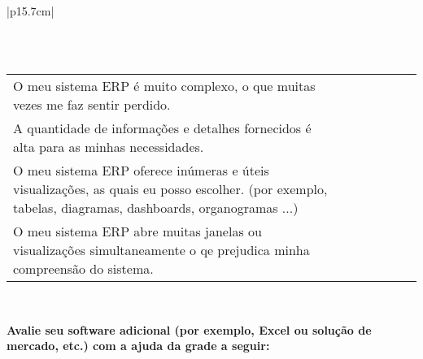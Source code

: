 \begin{longtable}{|p{15.7cm}|}
\begin{tabularx}{15.7 cm}{|X|X|X|X|X|X|X|}
		\hline
	\end{tabularx}\\
	\tiny \begin{tabularx}{15.7 cm}{|X|X|X|X|X|X|X|}
		\hline
		& {\rotatebox[origin=c]{90}{\parbox[c]{2.5cm}{\centering \textcolor{white}{.}\newline \medskip Concordo Completamente}}} 
		& {\rotatebox[origin=c]{90}{\parbox[c]{2.5cm}{\centering \textcolor{white}{.}\newline \medskip Concordo Parcialmente}}} 
		& {\rotatebox[origin=c]{90}{\parbox[c]{2.5cm}{\centering \textcolor{white}{.}\newline \medskip Não Concordo \newline Nem Discordo}}}	 
		& {\rotatebox[origin=c]{90}{\parbox[c]{2.5cm}{\centering \textcolor{white}{.}\newline \medskip Discordo  Parcialmente }}} 
		& {\rotatebox[origin=c]{90}{\parbox[c]{2.5cm}{\centering \textcolor{white}{.}\newline \medskip Discordo  Completamente  }}}
		& {\rotatebox[origin=c]{90}{\parbox[c]{2.5cm}{\centering \textcolor{white}{.}\newline  \textcolor{white}{.}\newline Eu Não Sei }}} \\
		\hline
		O meu sistema ERP é muito complexo, o que muitas vezes me faz sentir perdido. &   &   &   &   &   &  \\
		\hline
		A quantidade de informações e detalhes fornecidos é alta para as minhas necessidades. &   &   &   &   &   &  \\
		\hline
		O meu sistema ERP oferece inúmeras e úteis visualizações, as quais eu posso escolher. (por exemplo, tabelas, diagramas, dashboards, organogramas ...) &   &   &   &   &   &  \\
		\hline
		O meu sistema ERP abre muitas janelas ou visualizações simultaneamente o qe prejudica minha compreensão do sistema. &   &   &   &   &   &  \\
		\hline
	\end{tabularx}\\
	\begin{Spacing}{0.8} \end{Spacing}
	\begin{Spacing}{0.8} 
		\textbf{Avalie seu software adicional (por exemplo, Excel ou solução de mercado, etc.) com a ajuda da grade a seguir:} \end{Spacing} 
	\begin{Spacing}{2.0} 

\end{Spacing}
\end{longtable}
